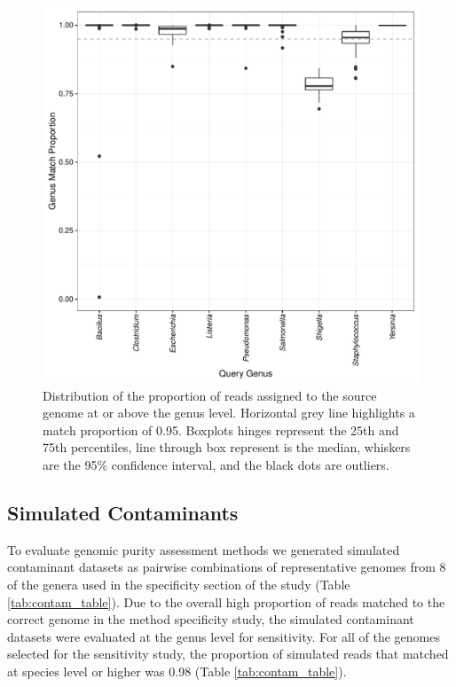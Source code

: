\documentclass[fleqn,10pt,lineno]{wlpeerj}\usepackage[]{graphicx}\usepackage[]{color}
\makeatletter
\def\maxwidth{ %
  \ifdim\Gin@nat@width>\linewidth
    \linewidth
  \else
    \Gin@nat@width
  \fi
}
\newenvironment{knitrout}{}{} %
\makeatother
\begin{document}
\begin{knitrout}
\color{fgcolor}\begin{figure}
\includegraphics[width=\maxwidth]{figure/single_genus-1} \caption[Distribution of the proportion of reads assigned to the source genome at or above the genus level]{Distribution of the proportion of reads assigned to the source genome at or above the genus level. Horizontal grey line highlights a match proportion of 0.95. Boxplots hinges represent the 25th and 75th percentiles, line through box represent is the median, whiskers are the 95\% confidence interval, and the black dots are outliers.}\label{fig:single_genus}
\end{figure}


\end{knitrout}

\subsection*{Simulated Contaminants}
To evaluate genomic purity assessment methods we generated simulated contaminant datasets as pairwise combinations of representative genomes from 8 of the genera used in the specificity section of the study (Table \ref{tab:contam_table}). 
Due to the overall high proportion of reads matched to the correct genome in the method specificity study, the simulated contaminant datasets were evaluated at the genus level for sensitivity. 
For all of the genomes selected for the sensitivity study, the proportion of simulated reads that matched at species level or higher was 0.98 (Table \ref{tab:contam_table}).  
\end{document}
